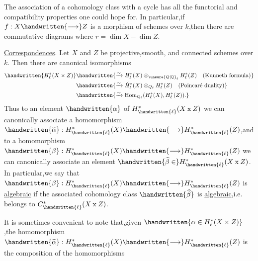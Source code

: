 The association of a cohomology class with a cycle has all the functorial and compatibility properties one could hope for. In particular,if $f:X\handwritten{\longrightarrow}Z$ is a morphism of schemes over $k$,then there are commutative diagrams
where $r=\dim X-\dim Z$.

\uline{Correspondences}. Let $X$ and $Z$ be projective,smooth, and connected schemes over $k$. Then there are canonical isomorphisms
\[
\begin{aligned}
\handwritten{H_\ell^*(X\times Z)}&\handwritten{\xrightarrow{\sim}H_\ell^*(X)\otimes_{\unsure{Q|\mathbb{Q}}_\ell}H_\ell^*(Z)\quad\text{(Kunneth formula)}}\\
&\handwritten{\xrightarrow{\sim}\check{H}_\ell^*(X)\otimes_{Q_\ell}H_\ell^*(Z)\quad\text{(Poincaré duality)}}\\
&\handwritten{\xrightarrow{\sim}\operatorname{Hom}_{Q_\ell}(H_\ell^*(X),H_\ell^*(Z)).}
\end{aligned}
\]
Thus to an element $\handwritten{\alpha}$ of $H_{\handwritten{\ell}}^*(X\mathbin{\mathrm{x}}Z)$ we can canonically associate a homomorphism $\handwritten{\widetilde{\alpha}}:H_{\handwritten{\ell}}^*(X)\handwritten{\longrightarrow}H_{\handwritten{\ell}}^*(Z)$,and to a homomorphism $\handwritten{\beta}:H_{\handwritten{\ell}}^*(X)\handwritten{\longrightarrow}H_{\handwritten{\ell}}^*(Z)$ we can canonically associate an element $\handwritten{\widehat{\beta}\in}H_{\handwritten{\ell}}^*(X\mathbin{\mathrm{x}}Z)$. In particular,we say that $\handwritten{\beta}:H_{\handwritten{\ell}}^*(X)\handwritten{\longrightarrow}H_{\handwritten{\ell}}^*(Z)$ is \uline{algebraic} if the associated cohomology class $\handwritten{\widehat{\beta}}$ is \uline{algebraic},i.e. belongs to $C_{\handwritten{\ell}}^*(X\mathbin{\mathrm{x}}Z)$.

It is sometimes convenient to note that,given $\handwritten{\alpha\in H_\ell^*(X\times Z)}$,the homomorphism $\handwritten{\widetilde{\alpha}}:H_{\handwritten{\ell}}^*(X)\handwritten{\longrightarrow}H_{\handwritten{\ell}}^*(Z)$ is the composition of the homomorphisms

